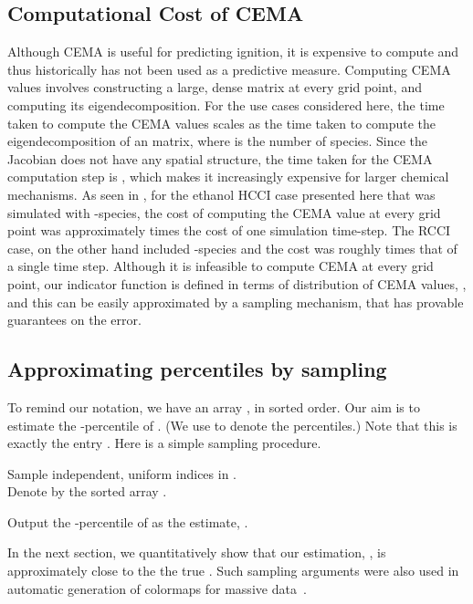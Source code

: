 \documentclass[final]{siamltex}
\begin{document}
\subsection{Computational Cost of CEMA}
Although CEMA is useful for predicting ignition, it is expensive to
compute and thus historically has not been used as a predictive measure. 
Computing CEMA values involves constructing  a large, dense matrix at every grid
point, and computing its eigendecomposition. For the use cases considered here, the time taken to compute the
CEMA values scales as the time taken to compute the eigendecomposition of an  matrix,
where  is the number of species.
Since the Jacobian does not have any spatial structure, the time taken for the CEMA computation step is
, which makes it increasingly expensive for larger chemical mechanisms. As seen in 
, for the ethanol
HCCI case presented here that was simulated with -species, the cost of computing the CEMA value
at every grid point was approximately  times the cost of one simulation time-step. The RCCI case, 
on the other hand included -species and the cost was roughly  times that of a single time step.
Although it is infeasible to compute CEMA at every grid point,  our indicator
function is defined in 
terms of distribution of  CEMA values, , and this can be easily approximated by a sampling mechanism, that has provable 
guarantees on the error. 

\subsection{Approximating percentiles by sampling} \label{sec:samp}
To remind our notation,  we have an array , in sorted order.
Our aim is to estimate the -percentile of . (We use  to denote
the percentiles.) Note that this 
is exactly the entry . Here is a simple sampling procedure. \\
\begin{compactenum}
	\item Sample  independent, uniform indices 
	in . \\ Denote by  the sorted array .
	\item Output the -percentile of  as the estimate, . \\
\end{compactenum}

In the next section, we quantitatively show that our estimation, , is approximately close to the the true .
Such sampling arguments were also used in automatic generation of colormaps for massive data~\cite{TBSP13}.
\end{document}
